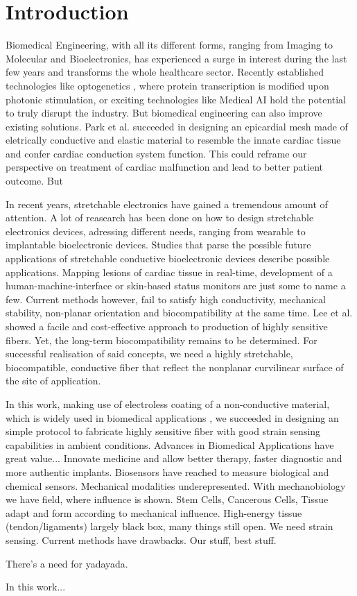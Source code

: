 \section{Introduction}
Biomedical Engineering, with all its different forms, ranging from Imaging to Molecular and Bioelectronics, has experienced a surge in interest during the last few years and transforms the whole healthcare sector. \cite{BiomedicalIndustry} Recently established technologies like optogenetics \cite{Optogenetics}, where protein transcription is modified upon photonic stimulation, or exciting technologies like Medical AI \cite{MedicalAI} hold the potential to truly disrupt the industry. But biomedical engineering can also improve existing solutions. Park et al. \cite{EpicardialMesh} succeeded in designing an epicardial mesh made of eletrically conductive and elastic material to resemble the innate cardiac tissue and confer cardiac conduction system function. This could reframe our perspective on treatment of cardiac malfunction and lead to better patient outcome. But  

In recent years, stretchable electronics have gained a tremendous amount of attention. \cite{Cherenack, Lee} A lot of reasearch has been done on how to design stretchable electronics devices, adressing different needs, ranging from wearable to implantable bioelectronic devices. Studies that parse the possible future applications of stretchable conductive bioelectronic devices describe possible applications. Mapping lesions of cardiac tissue in real-time, development of a human-machine-interface or skin-based status monitors are just some to name a few. \cite{Hochberg,Kim} Current methods however, fail to satisfy high conductivity, mechanical stability, non-planar orientation and biocompatibility at the same time. Lee et al. \cite{Lee} showed a facile and cost-effective approach to production of highly sensitive fibers. Yet, the long-term biocompatibility remains to be determined. For successful realisation of said concepts, we need a highly stretchable, biocompatible, conductive fiber that reflect the nonplanar curvilinear surface of the site of application.

In this work, making use of electroless coating of a non-conductive material, which is widely used in biomedical applications \cite{Pinchuk}, we succeeded in designing an simple protocol to fabricate  highly sensitive fiber with good strain sensing capabilities in ambient conditions.
Advances in Biomedical Applications have great value... Innovate medicine and allow better therapy, faster diagnostic and more authentic implants. Biosensors have reached to measure biological and chemical sensors. Mechanical modalities underepresented. With mechanobiology we have field, where influence is shown. Stem Cells, Cancerous Cells, Tissue adapt and form according to mechanical influence. High-energy tissue (tendon/ligaments) largely black box, many things still open. We need strain sensing. Current methods have drawbacks. Our stuff, best stuff. 

There's a need for yadayada.

In this work...